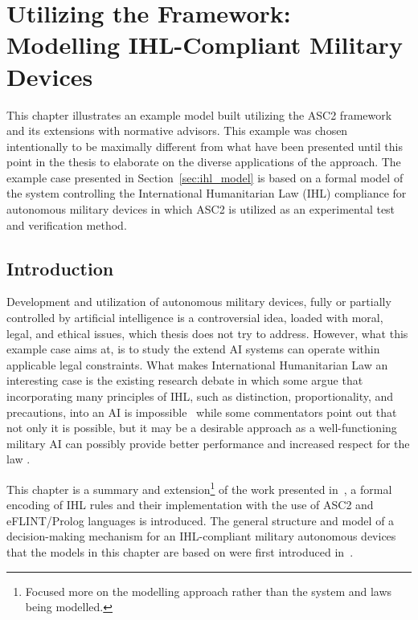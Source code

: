\chapter{Utilizing the Framework: Modelling IHL-Compliant Military Devices}

This chapter illustrates an example model built utilizing the ASC2 framework and its extensions with normative advisors. This example was chosen intentionally to be maximally different from what have been presented until this point in the thesis to elaborate on the diverse applications of the approach. The example case presented in Section~\ref{sec:ihl_model} is based on a formal model of the system controlling the International Humanitarian Law (IHL) compliance for autonomous military devices in which ASC2 is utilized as an experimental test and verification method.%


\section{Introduction}
Development and utilization of autonomous military devices, fully or partially controlled by artificial intelligence is a controversial idea, loaded with moral, legal, and ethical issues, which thesis does not try to address. However, what this example case aims at, is to study the extend AI systems can operate within applicable legal constraints. What makes International Humanitarian Law an interesting case is the existing research debate in which some argue that incorporating many principles of IHL, such as distinction, proportionality, and precautions, into an AI is impossible~\cite{115CrootofRcrdz,120Szpak} while some commentators point out that not only it is possible, but it may be a desirable approach as a well-functioning military AI can possibly provide better performance and increased respect for the law \cite{119DoDaiprinc,119NeyPCIslKeynt}.

This chapter is a summary and extension\footnote{Focused more on the modelling approach rather than the system and laws being modelled.} of the work presented in~\cite{zurek2022jurix}, a formal encoding of IHL rules and their implementation with the use of ASC2 and eFLINT/Prolog languages is introduced. The general structure and model of a decision-making mechanism for an IHL-compliant military autonomous devices that the models in this chapter are based on were first introduced in~\cite{zurek-coine22}.


